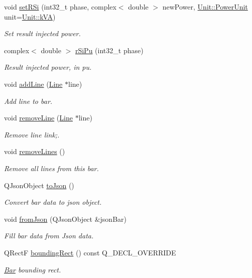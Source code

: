 \begin{DoxyCompactItemize}
void \hyperlink{group___models_ga36d3d54b66584a0557c0c141f4636d4c}{set\+R\+Si} (int32\+\_\+t phase, complex$<$ double $>$ new\+Power, \hyperlink{class_unit_ace265ae255370ccacfd5370337572c3b}{Unit\+::\+Power\+Unit} unit=\hyperlink{class_unit_ace265ae255370ccacfd5370337572c3ba72b181a842ae2759488a2fa1410d3696}{Unit\+::k\+V\+A})
\begin{DoxyCompactList}\small\item\em Set result injected power. \end{DoxyCompactList}\item 
complex$<$ double $>$ \hyperlink{group___models_ga1fa1b99d17dd19fafcf8309aba4fc758}{r\+Si\+Pu} (int32\+\_\+t phase)
\begin{DoxyCompactList}\small\item\em Result injected power, in pu. \end{DoxyCompactList}\item 
void \hyperlink{group___models_ga8cbd2f62d92e69ce6c8d561b682464b6}{add\+Line} (\hyperlink{class_line}{Line} $\ast$line)
\begin{DoxyCompactList}\small\item\em Add line to bar. \end{DoxyCompactList}\item 
void \hyperlink{group___models_ga2536c0e5cb97fb627b3520826ece2c99}{remove\+Line} (\hyperlink{class_line}{Line} $\ast$line)
\begin{DoxyCompactList}\small\item\em Remove line link;. \end{DoxyCompactList}\item 
void \hyperlink{group___models_ga4ea1a2074cb45968d80d6add571884a4}{remove\+Lines} ()
\begin{DoxyCompactList}\small\item\em Remove all lines from this bar. \end{DoxyCompactList}\item 
Q\+Json\+Object \hyperlink{group___models_ga3eb84c42b687db6cd98e11b8bd38c86e}{to\+Json} ()
\begin{DoxyCompactList}\small\item\em Convert bar data to json object. \end{DoxyCompactList}\item 
void \hyperlink{group___models_ga1df62f03dd3a066ceaf6588ba6bb6004}{from\+Json} (Q\+Json\+Object \&json\+Bar)
\begin{DoxyCompactList}\small\item\em Fill bar data from Json data. \end{DoxyCompactList}\item 
Q\+Rect\+F \hyperlink{group___models_ga8279d8109019cc7e139e2023690496be}{bounding\+Rect} () const Q\+\_\+\+D\+E\+C\+L\+\_\+\+O\+V\+E\+R\+R\+I\+D\+E
\begin{DoxyCompactList}\small\item\em \hyperlink{class_bar}{Bar} bounding rect. \end{DoxyCompactList}\end{DoxyCompactItemize}
